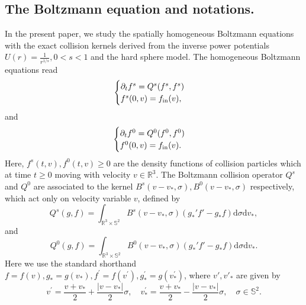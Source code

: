 \documentclass[reqno,10pt]{amsart}
\let\pa=\partial
\def\pa{\partial}
\theoremstyle{definition}
\numberwithin{equation}{section}
\begin{document}
\subsection{The Boltzmann equation and notations.} In the present paper, we study the spatially homogeneous Boltzmann equations with the exact collision kernels derived from the inverse power potentials $U(r)=\frac{1}{r^{1/s}}, 0<s<1$ and the hard sphere model. The homogeneous Boltzmann equations read
\begin{equation}\label{inverse-pl-s}
\begin{cases}
\pa_t f^s=Q^s(f^s,f^s)\\
f^s(0,v)=f_{\textup{in}}(v),
\end{cases}  
\end{equation}
and
\begin{equation}\label{hard-sphere}
\begin{cases}
\pa_t f^0=Q^0(f^0,f^0)\\
f^0(0,v)=f_{\textup{in}}(v).
\end{cases}
\end{equation}
Here, $f^s(t,v),f^0(t,v)\ge 0$ are the density functions of collision particles which at time $t\ge 0$ moving with velocity $v\in\mathbb{R}^3$. The Boltzmann collision operator $Q^s$ and $Q^0$ are associated to the kernel $B^s(v-v_*,\sigma), B^0(v-v_*,\sigma)$ respectively, which act only on velocity variable $v$, defined by
$$Q^s(g,f)=\int_{\mathbb{R}^3\times \mathbb{S}^2}B^s(v-v_*,\sigma)(g_*'f'-g_*f)\mathrm{d}\sigma\mathrm{d}v_*,$$
and
$$Q^0(g,f)=\int_{\mathbb{R}^3\times \mathbb{S}^2}B^0(v-v_*,\sigma)(g_*'f'-g_*f)\mathrm{d}\sigma\mathrm{d}v_*.$$
Here we use the standard shorthand $f=f(v), g_*=g\left(v_*\right), f^{\prime}=f\left(v^{\prime}\right), g_*^{\prime}=g\left(v_*^{\prime}\right)$, where $v',v'_*$ are given by 
$$v^{\prime}=\frac{v+v_*}{2}+\frac{\left|v-v_*\right|}{2} \sigma, \quad v_*^{\prime}=\frac{v+v_*}{2}-\frac{\left|v-v_*\right|}{2} \sigma, \quad \sigma \in \mathbb{S}^{2} .$$

\end{document}
